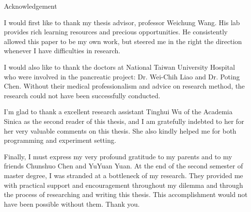 


\doublespacing

\begin{center}
\Large{{Acknowledgement}}\\
\end{center}
I would first like to thank my thesis advisor, professor Weichung Wang. His lab provides rich learning resources and precious opportunities. He consistently allowed this paper to be my own work, but steered me in the right the direction whenever I have difficulties in research. 

I would also like to thank the doctors at National Taiwan University Hospital who were involved in the pancreatic project: Dr. Wei-Chih Liao and Dr. Poting Chen. Without their medical professionalism and advice on research method, the research could not have been successfully conducted. 

I'm glad to thank a excellent research assistant Tinghui Wu of the Academia Sinica as the second reader of this thesis, and I am gratefully indebted to her for her very valuable comments on this thesis. She also kindly helped me for both programming and experiment setting. 

Finally, I must express my very profound gratitude to my parents and to my friends Chunshuo Chen and YuYuan Yuan. At the end of the second semester of master degree, I was stranded at a bottleneck of my research. They provided me with practical support and encouragement throughout my dilemma and through the process of researching and writing this thesis.  This accomplishment would not have been possible without them. Thank you. 

